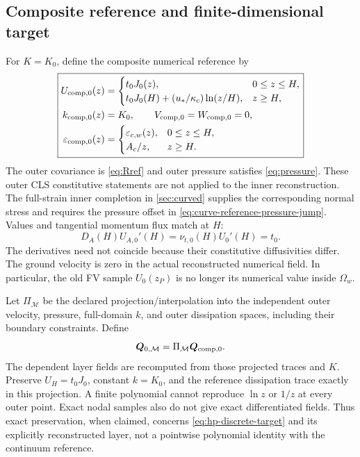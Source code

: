\documentclass[11pt,a4paper]{article}
\numberwithin{equation}{section}
\newcommand{\eps}{\varepsilon}
\newcommand{\ust}{u_*}
\newcommand{\kc}{\kappa_c}
\newcommand{\Aref}{A_c}
\newcommand{\ECw}{\eps_{c,w}}
\begin{document}
\subsection{Composite reference and finite-dimensional target}
For $K=K_0$, define the composite numerical reference by
\begin{equation}
 \boxed{
 \begin{aligned}
 U_{\rm comp,0}(z)&=
 \begin{cases}
  t_0J_0(z),&0\leq z\leq H,\\
  t_0J_0(H)+(\ust/\kc)\ln(z/H),&z\geq H,
 \end{cases}\\
 k_{\rm comp,0}(z)&=K_0,\qquad V_{\rm comp,0}=W_{\rm comp,0}=0,\\
 \eps_{\rm comp,0}(z)&=
 \begin{cases}
  \ECw(z),&0\leq z\leq H,\\
  \Aref/z,&z\geq H.
 \end{cases}
 \end{aligned}}
 \label{eq:composite-hp}
\end{equation}
The outer covariance is \cref{eq:Rref} and outer pressure satisfies
\cref{eq:pressure}. These outer CLS constitutive statements are not
applied to the inner reconstruction. The full-strain inner completion
in \cref{sec:curved} supplies the corresponding normal stress and
requires the pressure offset in \cref{eq:curve-reference-pressure-jump}. Values and tangential
momentum flux match at $H$:
\begin{equation}
 D_A(H)U_{A,0}'(H)
 =\nu_{t,0}(H)U_0'(H)=t_0.
 \label{eq:hp-reference-flux}
\end{equation}
The derivatives need not coincide because their constitutive
diffusivities differ. The ground velocity is zero in the actual
reconstructed numerical field. In particular, the old FV sample
$U_0(z_P)$ is no longer its numerical value inside $\Omega_w$.

Let $\Pi_{\mathcal M}$ be the declared projection/interpolation into
the independent outer velocity, pressure, full-domain $k$, and outer
dissipation spaces, including their boundary constraints. Define
\begin{equation}
 \bm Q_{0,\mathcal M}=\Pi_{\mathcal M}\bm Q_{\rm comp,0}.
 \label{eq:hp-discrete-target}
\end{equation}
The dependent layer fields are recomputed from those projected traces
and $K$. Preserve $U_H=t_0J_0$, constant $k=K_0$, and the reference
dissipation trace exactly in this projection. A finite polynomial
cannot reproduce $\ln z$ or $1/z$ at every outer point. Exact nodal
samples also do not give exact differentiated fields. Thus exact
preservation, when claimed, concerns \cref{eq:hp-discrete-target}
and its explicitly reconstructed layer, not a pointwise polynomial
identity with the continuum reference.
\end{document}
